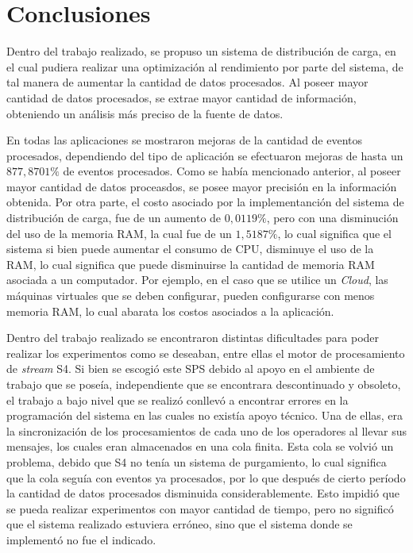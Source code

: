 \chapter{Conclusiones}
\label{cap:conclusiones}
Dentro del trabajo realizado, se propuso un sistema de distribución de carga, en el cual pudiera realizar una optimización al rendimiento por parte del sistema, de tal manera de aumentar la cantidad de datos procesados. Al poseer mayor cantidad de datos procesados, se extrae mayor cantidad de información, obteniendo un análisis más preciso de la fuente de datos.

En todas las aplicaciones se mostraron mejoras de la cantidad de eventos procesados, dependiendo del tipo de aplicación se efectuaron mejoras de hasta un $877,8701\%$ de eventos procesados. Como se había mencionado anterior, al poseer mayor cantidad de datos proceasdos, se posee mayor precisión en la información obtenida. Por otra parte, el costo asociado por la implementanción del sistema de distribución de carga, fue de un aumento de $0,0119\%$, pero con una disminución del uso de la memoria RAM, la cual fue de un $1,5187\%$, lo cual significa que el sistema si bien puede aumentar el consumo de CPU, disminuye el uso de la RAM, lo cual significa que puede disminuirse la cantidad de memoria RAM asociada a un computador. Por ejemplo, en el caso que se utilice un \textit{Cloud}, las máquinas virtuales que se deben configurar, pueden configurarse con menos memoria RAM, lo cual abarata los costos asociados a la aplicación.

Dentro del trabajo realizado se encontraron distintas dificultades para poder realizar los experimentos como se deseaban, entre ellas el motor de procesamiento de \textit{stream} S4. Si bien se escogió este SPS debido al apoyo en el ambiente de trabajo que se poseía, independiente que se encontrara descontinuado y obsoleto, el trabajo a bajo nivel que se realizó conllevó a encontrar errores en la programación del sistema en las cuales no existía apoyo técnico. Una de ellas, era la sincronización de los procesamientos de cada uno de los operadores al llevar sus mensajes, los cuales eran almacenados en una cola finita. Esta cola se volvió un problema, debido que S4 no tenía un sistema de purgamiento, lo cual significa que la cola seguía con eventos ya procesados, por lo que después de cierto período la cantidad de datos procesados disminuida considerablemente. Esto impidió que se pueda realizar experimentos con mayor cantidad de tiempo, pero no significó que el sistema realizado estuviera erróneo, sino que el sistema donde se implementó no fue el indicado.

